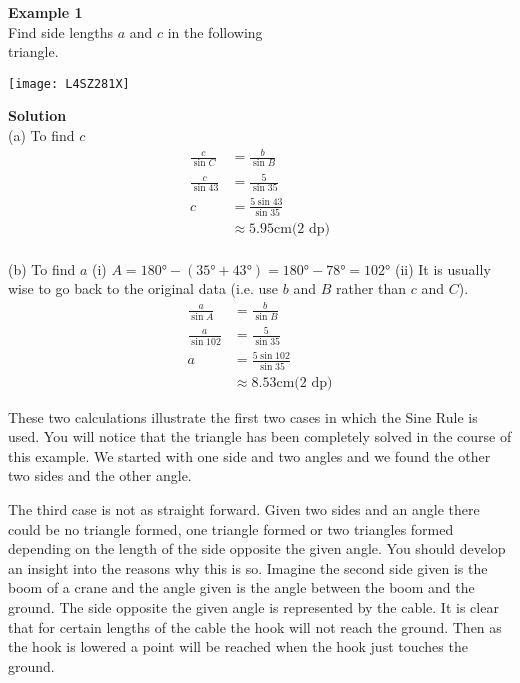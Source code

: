 \begin{multicols}{2}
\textbf{Example 1}\\ Find side lengths $a$ and $c$ in the following \\triangle.

\texttt{[image: L4SZ281X]}

\columnbreak
\textbf{Solution} \\(a) To find $c$
\begin{align*}\frac{c}{\sin  C} &  = \frac{b}{\sin  B} \\
\frac{c}{\sin  43 } &  = \frac{5}{\sin  35 } \\
c &  = \frac{5 \sin  43 }{\sin  35 } \\
&  \approx   5.95 \mbox{cm}\text{(2 dp)}\end{align*} \\

(b) To find $a$ 
(i) $A =\ang{180}  -(\ang{35}  +\ang{43} ) =\ang{180}  -\ang{78}  =\ang{102} $ 
(ii) It is usually wise to go back to the original data (i.e. use $b$ and $B$ rather than $c$ and $C$).
\begin{align*}\frac{a}{\sin  A} &  = \frac{b}{\sin  B} \\
\frac{a}{\sin  102 } &  = \frac{5}{\sin  35 } \\
a &  = \frac{5 \sin  102 }{\sin  35 } \\
&  \approx   8.53 \mbox{cm}\text{(2 dp)}\end{align*}\end{multicols}

These two calculations illustrate the first two cases in which the Sine Rule is used. You will notice that the triangle has been completely solved in the course of this example. We started with one side and two angles and we found the other two sides and the other angle. 

The third case is not as straight forward. Given two sides and an angle there could be no triangle formed, one triangle formed or two triangles formed depending on the length of the side opposite the given angle. You should develop an insight into the reasons why this is so. Imagine the second side given is the boom of a crane and the angle given is the angle between the boom and the ground. The side opposite the given angle is represented by the cable. It is clear that for certain lengths of the cable the hook will not reach the ground. Then as the hook is lowered a point will be reached when the hook just touches the ground.  

